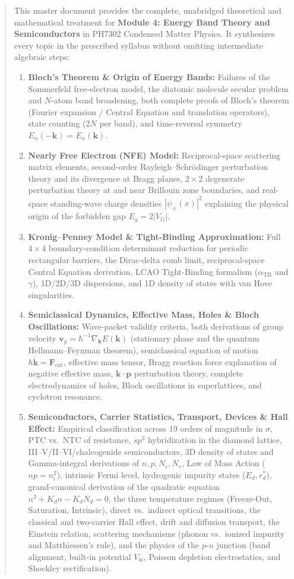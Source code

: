 \documentclass[11pt,a4paper]{article}
\newcommand{\abs}[1]{\left|#1\right|}
\newcommand{\vb}[1]{\mathbf{#1}}
\newcommand{\hb}{\hbar}
\newcommand{\kk}{\mathbf{k}}
\begin{document}
\begin{abstract}
\noindent
This master document provides the complete, unabridged theoretical and mathematical treatment for \textbf{Module 4: Energy Band Theory and Semiconductors} in PH7302 Condensed Matter Physics. It synthesizes every topic in the prescribed syllabus without omitting intermediate algebraic steps:
\begin{enumerate}[leftmargin=1.5cm, noitemsep]
    \item \textbf{Bloch's Theorem \& Origin of Energy Bands:} Failures of the Sommerfeld free-electron model, the diatomic molecule secular problem and $N$-atom band broadening, both complete proofs of Bloch's theorem (Fourier expansion / Central Equation and translation operators), state counting ($2N$ per band), and time-reversal symmetry $E_n(-\kk)=E_n(\kk)$.
    \item \textbf{Nearly Free Electron (NFE) Model:} Reciprocal-space scattering matrix elements, second-order Rayleigh--Schr\"odinger perturbation theory and its divergence at Bragg planes, $2\times 2$ degenerate perturbation theory at and near Brillouin zone boundaries, and real-space standing-wave charge densities $\abs{\psi_\pm(x)}^2$ explaining the physical origin of the forbidden gap $E_g = 2\abs{V_G}$.
    \item \textbf{Kronig--Penney Model \& Tight-Binding Approximation:} Full $4\times 4$ boundary-condition determinant reduction for periodic rectangular barriers, the Dirac-delta comb limit, reciprocal-space Central Equation derivation, LCAO Tight-Binding formalism ($\alpha_{\mathrm{TB}}$ and $\gamma$), 1D/2D/3D dispersions, and 1D density of states with van Hove singularities.
    \item \textbf{Semiclassical Dynamics, Effective Mass, Holes \& Bloch Oscillations:} Wave-packet validity criteria, both derivations of group velocity $\vb{v}_g = \hb^{-1}\nabla_{\kk}E(\kk)$ (stationary phase and the quantum Hellmann--Feynman theorem), semiclassical equation of motion $\hb\dot{\kk} = \vb{F}_{\mathrm{ext}}$, effective mass tensor, Bragg reaction force explanation of negative effective mass, $\kk\cdot\vb{p}$ perturbation theory, complete electrodynamics of holes, Bloch oscillations in superlattices, and cyclotron resonance.
    \item \textbf{Semiconductors, Carrier Statistics, Transport, Devices \& Hall Effect:} Empirical classification across 19 orders of magnitude in $\sigma$, PTC vs.\ NTC of resistance, $sp^3$ hybridization in the diamond lattice, III--V/II--VI/chalcogenide semiconductors, 3D density of states and Gamma-integral derivations of $n, p, N_c, N_v$, Law of Mass Action ($np=n_i^2$), intrinsic Fermi level, hydrogenic impurity states ($E_d, r_d^*$), grand-canonical derivation of the quadratic equation $n^2 + K_d n - K_d N_d = 0$, the three temperature regimes (Freeze-Out, Saturation, Intrinsic), direct vs.\ indirect optical transitions, the classical and two-carrier Hall effect, drift and diffusion transport, the Einstein relation, scattering mechanisms (phonon vs.\ ionized impurity and Matthiessen's rule), and the physics of the $p$-$n$ junction (band alignment, built-in potential $V_{bi}$, Poisson depletion electrostatics, and Shockley rectification).

\end{enumerate}
\end{abstract}
\end{document}
